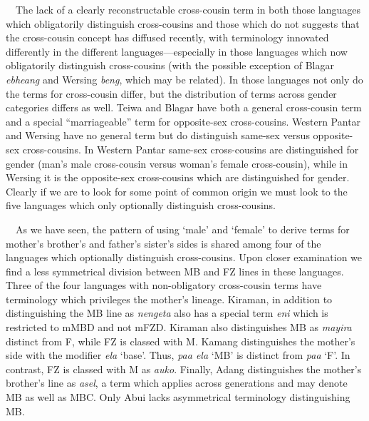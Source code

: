 \ \ The lack of a clearly reconstructable cross-cousin term in both those languages which obligatorily distinguish cross-cousins and those which do not suggests that the cross-cousin concept has diffused recently, with terminology innovated differently in the different languages---especially in those languages which now obligatorily distinguish cross-cousins (with the possible exception of Blagar \textit{ebheang} and Wersing \textit{beng}, which may be related). In those languages not only do the terms for cross-cousin differ, but the distribution of terms across gender categories differs as well. Teiwa and Blagar have both a general cross-cousin term and a special {\textquotedblleft}marriageable{\textquotedblright} term for opposite-sex cross-cousins. Western Pantar and Wersing have no general term but do distinguish same-sex versus opposite-sex cross-cousins. In Western Pantar same-sex cross-cousins are distinguished for gender (man{\textquoteright}s male cross-cousin versus woman{\textquoteright}s female 
cross-cousin), while in Wersing it is the opposite-sex cross-cousins which are distinguished for gender. Clearly if we are to look for some point of common origin we must look to the five languages which only optionally distinguish cross-cousins.

\ \ As we have seen, the pattern of using {\textquoteleft}male{\textquoteright} and {\textquoteleft}female{\textquoteright} to derive terms for mother{\textquoteright}s brother{\textquoteright}s and father{\textquoteright}s sister{\textquoteright}s sides is shared among four of the languages which optionally distinguish cross-cousins. Upon closer examination we find a less symmetrical division between MB and FZ lines in these languages. Three of the four languages with non-obligatory cross-cousin terms have terminology which privileges the mother{\textquoteright}s lineage. Kiraman, in addition to distinguishing the MB line as \textit{nengeta} also has a special term \textit{eni} which is restricted to mMBD and not mFZD. Kiraman also distinguishes MB as \textit{mayira} distinct from F, while FZ is classed with M. Kamang distinguishes the mother{\textquoteright}s side with the modifier \textit{ela} {\textquoteleft}base{\textquoteright}. Thus, \textit{paa ela} {\textquoteleft}MB{\textquoteright} is distinct 
from \textit{paa }{\textquoteleft}F{\textquoteright}. In contrast, FZ is classed with M as \textit{auko}. Finally, Adang distinguishes the mother{\textquoteright}s brother{\textquoteright}s line as \textit{asel}, a term which applies across generations and may denote MB as well as MBC. Only Abui lacks asymmetrical terminology distinguishing MB.

